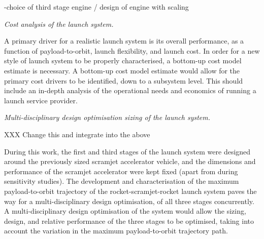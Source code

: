 \noindent
-choice of third stage engine / design of engine with scaling

\vspace{10pt}
 \textit{Cost analysis of the launch system.}

 \noindent
A primary driver for a realistic launch system is its overall performance, as a function of payload-to-orbit, launch flexibility, and launch cost. In order for a new style of launch system to be properly characterised, a bottom-up cost model estimate is necessary. A bottom-up cost model estimate would allow for the primary cost drivers to be identified, down to a subsystem level. This should include an in-depth analysis of the operational needs and economics of running a launch service provider.

\vspace{10pt}
 \textit{Multi-disciplinary design optimisation sizing of the launch system.}

 \noindent
 XXX Change this and integrate into the above
 
During this work, the first and third stages of the launch system were designed around the previously sized scramjet accelerator vehicle, and the dimensions and performance of the scramjet accelerator were kept fixed (apart from during sensitivity studies).
The development and characterisation of the maximum payload-to-orbit trajectory of the rocket-scramjet-rocket launch system paves the way for a multi-disciplinary design optimisation, of all three stages concurrently. A multi-disciplinary design optimisation of the system would allow the sizing, design, and relative performance of the three stages to be optimised, taking into account the variation in the maximum payload-to-orbit trajectory path.  


